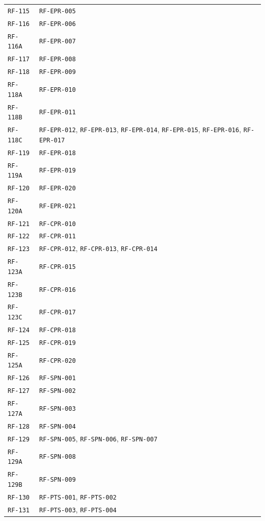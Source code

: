 \documentclass[10pt,letterpaper]{article}
\begin{document}
\begin{longtable}{P{3.0cm}P{10.6cm}}
\texttt{RF-115} & \texttt{RF-EPR-005}\\
\texttt{RF-116} & \texttt{RF-EPR-006}\\
\texttt{RF-116A} & \texttt{RF-EPR-007}\\
\texttt{RF-117} & \texttt{RF-EPR-008}\\
\texttt{RF-118} & \texttt{RF-EPR-009}\\
\texttt{RF-118A} & \texttt{RF-EPR-010}\\
\texttt{RF-118B} & \texttt{RF-EPR-011}\\
\texttt{RF-118C} & \texttt{RF-EPR-012}, \texttt{RF-EPR-013}, \texttt{RF-EPR-014}, \texttt{RF-EPR-015}, \texttt{RF-EPR-016}, \texttt{RF-EPR-017}\\
\texttt{RF-119} & \texttt{RF-EPR-018}\\
\texttt{RF-119A} & \texttt{RF-EPR-019}\\
\texttt{RF-120} & \texttt{RF-EPR-020}\\
\texttt{RF-120A} & \texttt{RF-EPR-021}\\
\texttt{RF-121} & \texttt{RF-CPR-010}\\
\texttt{RF-122} & \texttt{RF-CPR-011}\\
\texttt{RF-123} & \texttt{RF-CPR-012}, \texttt{RF-CPR-013}, \texttt{RF-CPR-014}\\
\texttt{RF-123A} & \texttt{RF-CPR-015}\\
\texttt{RF-123B} & \texttt{RF-CPR-016}\\
\texttt{RF-123C} & \texttt{RF-CPR-017}\\
\texttt{RF-124} & \texttt{RF-CPR-018}\\
\texttt{RF-125} & \texttt{RF-CPR-019}\\
\texttt{RF-125A} & \texttt{RF-CPR-020}\\
\texttt{RF-126} & \texttt{RF-SPN-001}\\
\texttt{RF-127} & \texttt{RF-SPN-002}\\
\texttt{RF-127A} & \texttt{RF-SPN-003}\\
\texttt{RF-128} & \texttt{RF-SPN-004}\\
\texttt{RF-129} & \texttt{RF-SPN-005}, \texttt{RF-SPN-006}, \texttt{RF-SPN-007}\\
\texttt{RF-129A} & \texttt{RF-SPN-008}\\
\texttt{RF-129B} & \texttt{RF-SPN-009}\\
\texttt{RF-130} & \texttt{RF-PTS-001}, \texttt{RF-PTS-002}\\
\texttt{RF-131} & \texttt{RF-PTS-003}, \texttt{RF-PTS-004}\\

\end{longtable}
\end{document}
